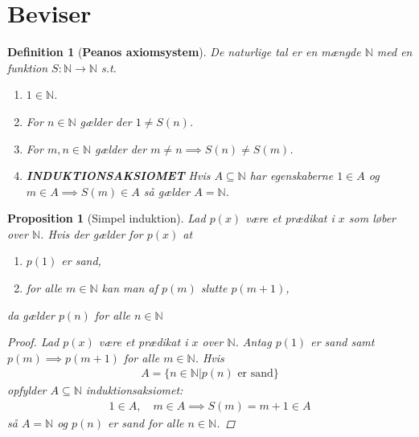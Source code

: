 \documentclass[10pt,twoside,openany,final]{memoir}
\theoremstyle{break}
\newtheorem{proposition}[section]{Proposition}
\newtheorem{definition}[section]{Definition}
\theoremstyle{Break}
\newcommand{\N}{\mathbb{N}}
\begin{document}
\section*{Beviser}
\begin{definition}[\textbf{Peanos axiomsystem}]
De naturlige tal er en mængde $\N$ med en funktion $S \colon \N \to \N$ s.t.
\begin{enumerate}
\item $1 \in \N$.
\item For $n \in \N$ gælder der $1 \neq S(n)$.
\item For $m,n \in \N$ gælder der $m\neq n \implies S(n) \neq S(m)$.
\item \textbf{INDUKTIONSAKSIOMET} Hvis $A \subseteq \N$ har egenskaberne $1 \in A$ og $m \in A \implies S(m) \in A$ så gælder $A=\N$.
\end{enumerate}
\end{definition}

\begin{proposition}[Simpel induktion]
Lad $p(x)$ være et prædikat i $x$ som løber over $\N$. Hvis der gælder for $p(x)$ at
\begin{enumerate}
\item $p(1)$ er sand,
\item for alle $m \in \N$ kan man af $p(m)$ slutte $p(m+1)$,
\end{enumerate}
da gælder $p(n)$ for alle $n \in \N$
\begin{proof}
Lad $p(x)$ være et prædikat i $x$ over $\N$. Antag $p(1)$ er sand samt $p(m) \implies p(m+1)$ for alle $m \in \N$. Hvis 
\begin{align*}
A= \{ n \in \N | p(n) \text{ er sand} \}
\end{align*}
opfylder $A \subseteq \N$ induktionsaksiomet:
\begin{align*}
1 \in A, \quad  m \in A \implies S(m)=m+1 \in A
\end{align*} 
så $A=\N$ og $p(n)$ er sand for alle $n \in \N$.
\end{proof}
\end{proposition}
\end{document}
